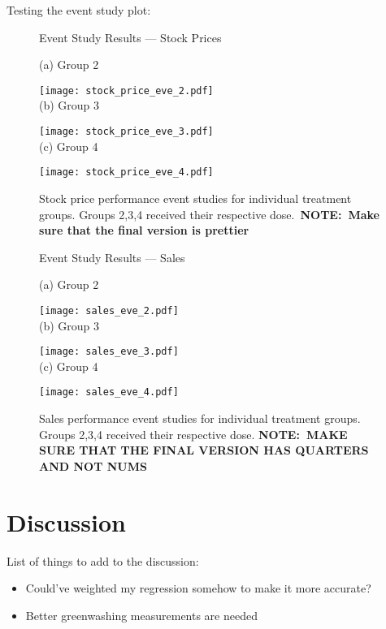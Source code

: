 \documentclass[12pt]{article}
\begin{document}
Testing the event study plot:
\newpage
\begin{figure}
    \caption{Event Study Results --- Stock Prices}
    \centering

    (a) Group 2
    
    \texttt{[image: stock\_price\_eve\_2.pdf]} \\
    
    (b) Group 3
    
    \texttt{[image: stock\_price\_eve\_3.pdf]} \\
    
    (c) Group 4
    
    \texttt{[image: stock\_price\_eve\_4.pdf]}
    
    \captionsetup{font=footnotesize}
    \caption*{Stock price performance event studies for individual treatment groups. Groups 2,3,4 received their respective dose.\ \textbf{NOTE:~Make sure that the final version is prettier}}
\end{figure}

\begin{figure}
    \caption{Event Study Results --- Sales}
    \centering

    (a) Group 2
    
    \texttt{[image: sales\_eve\_2.pdf]} \\
    
    (b) Group 3
    
    \texttt{[image: sales\_eve\_3.pdf]} \\
    
    (c) Group 4
    
    \texttt{[image: sales\_eve\_4.pdf]}
    
    \captionsetup{font=footnotesize}
    \caption*{Sales performance event studies for individual treatment groups. Groups 2,3,4 received their respective dose. \textbf{NOTE:~MAKE SURE THAT THE FINAL VERSION HAS QUARTERS AND NOT NUMS}}
\end{figure}


\newpage


\section{Discussion}\label{sect:discussion}

List of things to add to the discussion:
\begin{itemize}
    \item Could've weighted my regression somehow to make it more accurate?
    \item Better greenwashing measurements are needed

\end{itemize}
\end{document}
